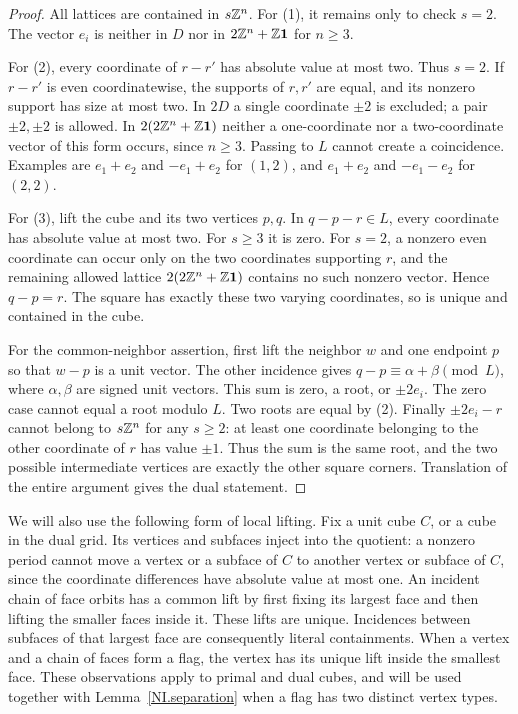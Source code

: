 \begin{proof}
All lattices are contained in $s\mathbb Z^n$. For (1), it remains only to
check $s=2$. The vector $e_i$ is neither in $D$ nor in
$2\mathbb Z^n+\mathbb Z\mathbf1$ for $n\ge3$.

For (2), every coordinate of $r-r'$ has absolute value at most two.
Thus $s=2$. If $r-r'$ is even coordinatewise, the supports of $r,r'$
are equal, and its nonzero support has size at most two. In $2D$ a
single coordinate $\pm2$ is excluded; a pair $\pm2,\pm2$ is allowed.
In $2(2\mathbb Z^n+\mathbb Z\mathbf1)$ neither a one-coordinate nor a two-coordinate
vector of this form occurs, since $n\ge3$. Passing to $L$ cannot
create a coincidence. Examples are $e_1+e_2$ and $-e_1+e_2$ for
$(1,2)$, and $e_1+e_2$ and $-e_1-e_2$ for $(2,2)$.

For (3), lift the cube and its two vertices $p,q$. In
$q-p-r\in L$, every coordinate has absolute value at most two.
For $s\ge3$ it is zero. For $s=2$, a nonzero even coordinate
can occur only on the two coordinates supporting $r$, and the
remaining allowed lattice $2(2\mathbb Z^n+\mathbb Z\mathbf1)$ contains no such
nonzero vector. Hence $q-p=r$. The square has exactly these two
varying coordinates, so is unique and contained in the cube.

For the common-neighbor assertion, first lift the neighbor $w$ and
one endpoint $p$ so that $w-p$ is a unit vector. The other incidence
gives $q-p\equiv\alpha+\beta\pmod L$, where $\alpha,\beta$ are
signed unit vectors. This sum is zero, a root, or $\pm2e_i$.
The zero case cannot equal a root modulo $L$. Two roots are equal
by (2). Finally $\pm2e_i-r$ cannot belong to $s\mathbb Z^n$ for any
$s\ge2$: at least one coordinate belonging to the other coordinate
of $r$ has value $\pm1$. Thus the sum is the same root, and the
two possible intermediate vertices are exactly the other square
corners. Translation of the entire argument gives the dual statement.
\end{proof}

We will also use the following form of local lifting. Fix a unit cube
$C$, or a cube in the dual grid. Its vertices and subfaces inject into
the quotient: a nonzero period cannot move a vertex or a subface of
$C$ to another vertex or subface of $C$, since the coordinate
differences have absolute value at most one. An incident chain of
face orbits has a common lift by first fixing its largest face and
then lifting the smaller faces inside it. These lifts are unique.
Incidences between subfaces of that largest face are consequently
literal containments. When a vertex and a chain of faces form a flag,
the vertex has its unique lift inside the smallest face. These
observations apply to primal and dual cubes, and will be used together
with Lemma~\ref{NI.separation} when a flag has two distinct vertex types.

